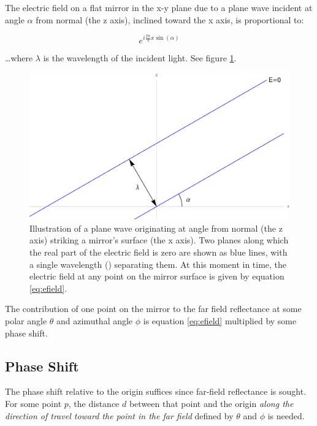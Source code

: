\documentclass[etd,senior,noacknowledgments]{BYUPhys}
\begin{document}
The electric field on a flat mirror in the x-y plane due to a plane wave incident at angle $\alpha$ from normal (the z axis), inclined toward the x axis, is proportional to:

\begin{equation} \label{eq:efield}
  e^{i\frac{2\pi}{\lambda}x\sin\left({\alpha}\right)}
\end{equation}

\ldots where $\lambda$ is the wavelength of the incident light. See figure \ref{fig:efield_at_angle}.

\begin{figure}
  \centerline{\includegraphics[width=\textwidth]{efield-at-angle}}
  \caption[Plane wave incident on mirror surface at angle \alpha]{\label{fig:efield_at_angle}
    Illustration of a plane wave originating at angle \alpha from normal (the z axis) striking a mirror's surface (the x axis). Two planes along which the real part of the electric field is zero are shown as blue lines, with a single wavelength (\lambda) separating them. At this moment in time, the electric field at any point on the mirror surface is given by equation \ref{eq:efield}.}
\end{figure}

The contribution of one point on the mirror to the far field reflectance at some polar angle $\theta$ and azimuthal angle $\phi$ is equation \ref{eq:efield} multiplied by some phase shift.

\subsection{Phase Shift} \label{sec:phase_shift}

The phase shift relative to the origin suffices since far-field reflectance is sought. For some point $p$, the distance $d$ between that point and the origin \textit{along the direction of travel toward the point in the far field} defined by $\theta$ and $\phi$ is needed.
\end{document}
